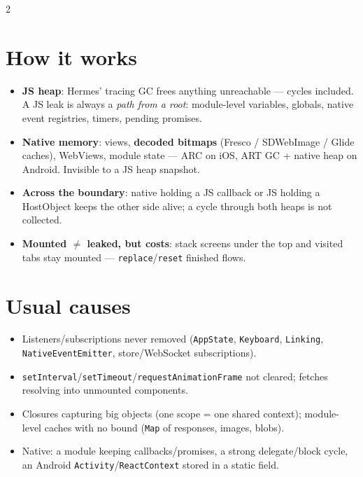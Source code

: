 \documentclass[8pt]{extarticle}
\begin{document}
\begin{multicols}{2}
\raggedright

\section{How it works}
\begin{itemize}\raggedright
  \item \textbf{JS heap}: Hermes' tracing GC frees anything unreachable — cycles included. A
        JS leak is always a \emph{path from a root}: module-level variables, globals, native
        event registries, timers, pending promises.
  \item \textbf{Native memory}: views, \textbf{decoded bitmaps} (Fresco / SDWebImage /
        Glide caches), WebViews, module state — ARC on iOS, ART GC + native heap on
        Android. Invisible to a JS heap snapshot.
  \item \textbf{Across the boundary}: native holding a JS callback or JS holding a
        HostObject keeps the other side alive; a cycle through both heaps is not collected.
  \item \textbf{Mounted $\ne$ leaked, but costs}: stack screens under the top and visited
        tabs stay mounted — \texttt{replace}/\texttt{reset} finished flows.
\end{itemize}

\section{Usual causes}
\begin{itemize}\raggedright
  \item Listeners/subscriptions never removed (\texttt{AppState}, \texttt{Keyboard},
        \texttt{Linking}, \texttt{NativeEventEmitter}, store/WebSocket subscriptions).
  \item \texttt{setInterval}/\texttt{setTimeout}/\texttt{requestAnimationFrame} not cleared;
        fetches resolving into unmounted components.
  \item Closures capturing big objects (one scope = one shared context); module-level
        caches with no bound (\texttt{Map} of responses, images, blobs).
  \item Native: a module keeping callbacks/promises, a strong delegate/block cycle, an
        Android \texttt{Activity}/\texttt{ReactContext} stored in a static field.
\end{itemize}


\end{multicols}
\end{document}
